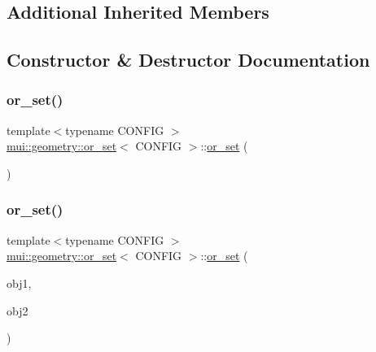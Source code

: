 \subsection*{Additional Inherited Members}


\subsection{Constructor \& Destructor Documentation}
\mbox{\label{classmui_1_1geometry_1_1or__set_abe2bca43b4f0f8ab5f303110e0e3cee9}} 
\subsubsection{\texorpdfstring{or\+\_\+set()}{or\_set()}\hspace{0.1cm}{\footnotesize\ttfamily [1/2]}}
{\footnotesize\ttfamily template$<$typename C\+O\+N\+F\+IG $>$ \\
\hyperlink{classmui_1_1geometry_1_1or__set}{mui\+::geometry\+::or\+\_\+set}$<$ C\+O\+N\+F\+IG $>$\+::\hyperlink{classmui_1_1geometry_1_1or__set}{or\+\_\+set} (\begin{DoxyParamCaption}{ }\end{DoxyParamCaption})\hspace{0.3cm}{\ttfamily [default]}}

\mbox{\label{classmui_1_1geometry_1_1or__set_af7cc1f5c494421966a751692afc3e4dc}} 
\subsubsection{\texorpdfstring{or\+\_\+set()}{or\_set()}\hspace{0.1cm}{\footnotesize\ttfamily [2/2]}}
{\footnotesize\ttfamily template$<$typename C\+O\+N\+F\+IG $>$ \\
\hyperlink{classmui_1_1geometry_1_1or__set}{mui\+::geometry\+::or\+\_\+set}$<$ C\+O\+N\+F\+IG $>$\+::\hyperlink{classmui_1_1geometry_1_1or__set}{or\+\_\+set} (\begin{DoxyParamCaption}\item[{\hyperlink{classmui_1_1geometry_1_1any__shape}{any\+\_\+shape}$<$ C\+O\+N\+F\+IG $>$}]{obj1,  }\item[{\hyperlink{classmui_1_1geometry_1_1any__shape}{any\+\_\+shape}$<$ C\+O\+N\+F\+IG $>$ \&}]{obj2 }\end{DoxyParamCaption})\hspace{0.3cm}{\ttfamily [inline]}}



